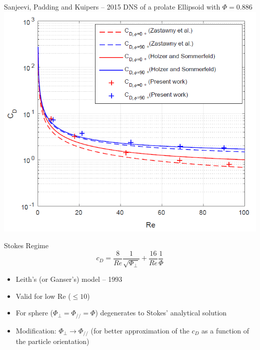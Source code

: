 \documentclass[11pt]{beamer}
\begin{document}
	\begin{frame}{Sanjeevi, Padding and Kuipers -- 2015}
		DNS of a prolate Ellipsoid with $ \Phi = 0.886 $
		\centering
		\includegraphics[height=.8\textheight]{DNS.png}
	\end{frame}

	\begin{frame}{Stokes Regime}
		\begin{equation*}
			c_D = \frac{8}{Re} \frac{1}{\sqrt{\Phi_{\perp}}} + \frac{16}{Re} \frac{1}{\Phi}
		\end{equation*}
		\vfill
		\begin{itemize}
			\item Leith's (or Ganser's) model -- 1993
			\item Valid for low Re ($\leq 10$)
			\item For sphere ($ \Phi_{\perp} = \Phi_{/\!/} = \Phi $) degenerates to Stokes' analytical solution
			\item Modification: $ \Phi_{\perp} \rightarrow \Phi_{/\!/} $   (for better approximation of the $ c_D $ as a function of the particle orientation)
		\end{itemize}
	\end{frame}
\end{document}
